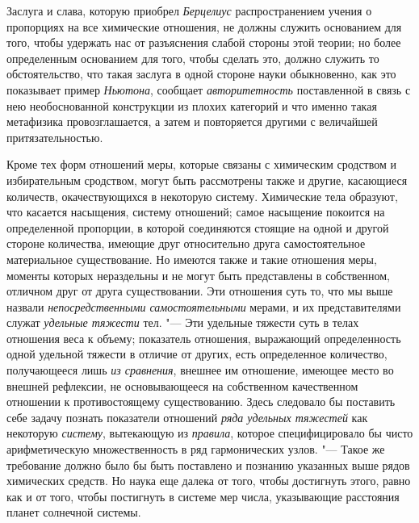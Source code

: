 Заслуга и слава, которую приобрел {\em Берцелиус}
распространением учения о пропорциях на все химические отношения, не должны
служить основанием для того, чтобы удержать нас от разъяснения слабой
стороны этой теории; но более определенным основанием для того, чтобы
сделать это, должно служить то обстоятельство, что такая заслуга в одной
стороне науки обыкновенно, как это показывает пример
{\em Ньютона}, сообщает
{\em авторитетность} поставленной в связь с нею
необоснованной конструкции из плохих категорий и что именно такая
метафизика провозглашается, а затем и повторяется другими с величайшей
притязательностью.

Кроме тех форм отношений меры, которые связаны с химическим сродством и
избирательным сродством, могут быть рассмотрены также и другие, касающиеся
количеств, окачествующихся в некоторую систему. Химические тела образуют,
что касается насыщения, систему отношений; самое насыщение покоится на
определенной пропорции, в которой соединяются стоящие на одной и другой
стороне количества, имеющие друг относительно друга самостоятельное
материальное существование. Но имеются также и такие отношения меры,
моменты которых нераздельны и не могут быть представлены в собственном,
отличном друг от друга существовании. Эти отношения суть то, что мы выше
назвали {\em непосредственными самостоятельными}
мерами, и их представителями служат {\em удельные
тяжести} тел. "--- Эти удельные тяжести суть в телах отношения веса к объему;
показатель отношения, выражающий определенность одной удельной тяжести в
отличие от других, есть определенное количество, получающееся лишь
{\em из сравнения}, внешнее им отношение, имеющее место
во внешней рефлексии, не основывающееся на собственном качественном
отношении к противостоящему существованию. Здесь следовало бы поставить
себе задачу познать показатели отношений {\em ряда
удельных тяжестей} как некоторую {\em систему},
вытекающую из {\em правила}, которое специфицировало бы
чисто арифметическую множественность в ряд гармонических узлов. "--- Такое же
требование должно было бы быть поставлено и познанию указанных выше рядов
химических средств. Но наука еще далека от того, чтобы достигнуть этого,
равно как и от того, чтобы постигнуть в системе мер числа, указывающие
расстояния планет солнечной системы.

